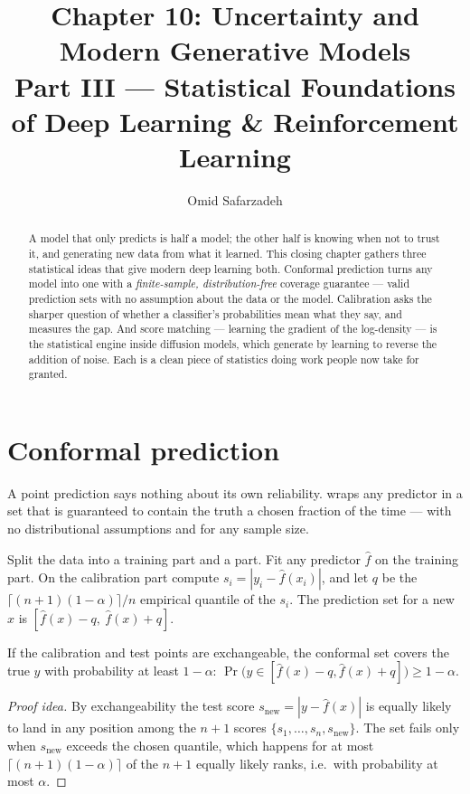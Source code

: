 \documentclass[11pt]{article}
\title{Chapter 10: Uncertainty and Modern Generative Models \\ \large Part III --- Statistical Foundations of Deep Learning \& Reinforcement Learning}
\author{Omid Safarzadeh}
\date{}
\begin{document}
\maketitle

\begin{abstract}
\noindent
A model that only predicts is half a model; the other half is knowing when not to
trust it, and generating new data from what it learned. This closing chapter
gathers three statistical ideas that give modern deep learning both. Conformal
prediction turns any model into one with a \emph{finite-sample, distribution-free}
coverage guarantee --- valid prediction sets with no assumption about the data or
the model. Calibration asks the sharper question of whether a classifier's
probabilities mean what they say, and measures the gap. And score matching ---
learning the gradient of the log-density --- is the statistical engine inside
diffusion models, which generate by learning to reverse the addition of noise.
Each is a clean piece of statistics doing work people now take for granted.
\end{abstract}

\tableofcontents

\section{Conformal prediction}

A point prediction says nothing about its own reliability.  wraps any predictor in a set that is guaranteed to contain the truth
a chosen fraction of the time --- with no distributional assumptions and for any
sample size.

\begin{definition}
Split the data into a training part and a  part. Fit any
predictor $\hat f$ on the training part. On the calibration part compute
 $s_i = |y_i - \hat f(x_i)|$, and let $q$ be the
$\lceil (n+1)(1-\alpha)\rceil / n$ empirical quantile of the $s_i$. The prediction
set for a new $x$ is $[\hat f(x)-q,\ \hat f(x)+q]$.
\end{definition}

\begin{theorem}
If the calibration and test points are exchangeable, the conformal set covers the
true $y$ with probability at least $1-\alpha$:
$\Pr\big(y\in[\hat f(x)-q,\hat f(x)+q]\big) \ge 1-\alpha$.
\end{theorem}
\begin{proof}[Proof idea]
By exchangeability the test score $s_{\text{new}}=|y-\hat f(x)|$ is equally likely
to land in any position among the $n+1$ scores $\{s_1,\dots,s_n,s_{\text{new}}\}$.
The set fails only when $s_{\text{new}}$ exceeds the chosen quantile, which happens
for at most $\lceil (n+1)(1-\alpha)\rceil$ of the $n+1$ equally likely ranks,
i.e.\ with probability at most $\alpha$.
\end{proof}
\end{document}
